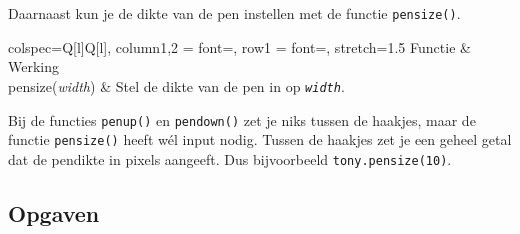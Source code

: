 \documentclass[../main]{subfiles}
\begin{document}
Daarnaast kun je de dikte van de pen instellen met de functie \texttt{pensize()}.

\begin{table}[ht]
    \centering
    \begin{tblr}{
        colspec={Q[l]Q[l]},
        column{1,2} = {font=\ttfamily},
        row{1} = {font=\sffamily\bfseries},
        stretch=1.5}
        \topline
        Functie & Werking\\
        pensize(\textit{width}) & Stel de dikte van de pen in op \textit{\texttt{width}}.\\
        \bottomline
    \end{tblr}
    \caption{Instelling van de pendikte}%
    \label{tbl:pen-dikte}
\end{table}

Bij de functies \texttt{penup()} en \texttt{pendown()} zet je niks tussen de haakjes, maar de functie \texttt{pensize()} heeft wél input nodig. Tussen de haakjes zet je een geheel getal dat de pendikte in pixels aangeeft. Dus bijvoorbeeld \texttt{tony.pensize(10)}.
\subsection*{Opgaven}
\end{document}
